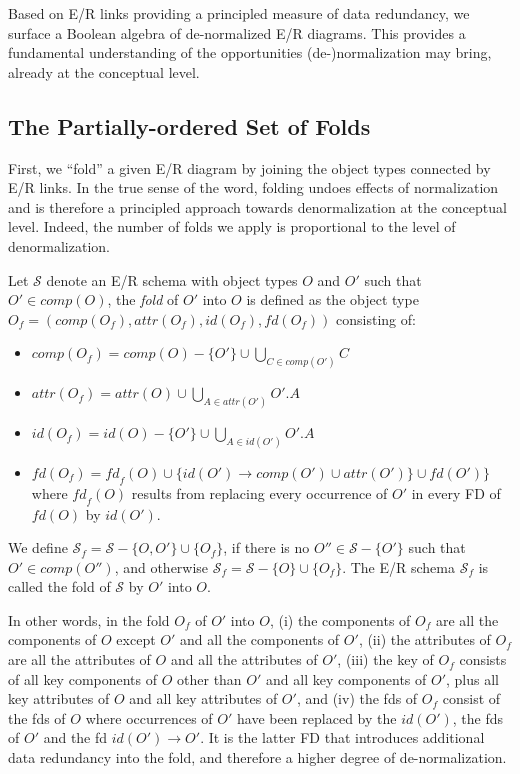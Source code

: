 \documentclass[sigconf]{acmart}
\begin{document}
Based on E/R links providing a principled measure of data redundancy, we surface a Boolean algebra of de-normalized E/R diagrams. This provides a fundamental understanding of the opportunities (de-)normalization may bring, already at the conceptual level.

\subsection{The Partially-ordered Set of Folds}

First, we ``fold'' a given E/R diagram by joining the object types connected by E/R links. In the true sense of the word, folding undoes effects of normalization and is therefore a principled approach towards denormalization at the conceptual level. Indeed, the number of folds we apply is proportional to the level of denormalization.

\begin{definition} Let $\mathcal{S}$ denote an E/R schema with object types $O$ and $O'$ such that $O'\in\textit{comp}(O)$, the \emph{fold} of $O'$ into $O$ is defined as the object type $O_f=(\textit{comp}(O_f),\textit{attr}(O_f),\textit{id}(O_f),\textit{fd}(O_f))$ consisting of:
\begin{itemize}
\item $\textit{comp}(O_f)=\textit{comp}(O)-\{O'\}\cup\bigcup_{C\in comp(O')}C$
\item $\textit{attr}(O_f)=\textit{attr}(O)\cup\bigcup_{A\in \textit{attr}(O')}O'.A$
\item $\textit{id}(O_f)=id(O)-\{O'\}\cup\bigcup_{A\in\textit{id}(O')}O'.A$
\item $\textit{fd}(O_f)=\textit{fd}_f(O)\cup\{\textit{id}(O')\rightarrow\textit{comp}(O')\cup\textit{attr}(O')\}\cup\textit{fd}(O')\}$ where $\textit{fd}_f(O)$ results from replacing every occurrence of $O'$ in every FD of $\textit{fd}(O)$ by $\textit{id}(O')$.
\end{itemize}
We define $\mathcal{S}_f=\mathcal{S}-\{O,O'\}\cup\{O_f\}$, if there is no $O''\in\mathcal{S}-\{O'\}$ such that $O'\in\textit{comp}(O'')$, and otherwise $\mathcal{S}_f=\mathcal{S}-\{O\}\cup\{O_f\}$. The E/R schema $\mathcal{S}_f$ is called the fold of $\mathcal{S}$ by $O'$ into $O$.
\end{definition}



In other words, in the fold $O_f$ of $O'$ into $O$, (i) the components of $O_f$ are all the components of $O$ except $O'$ and all the components of $O'$, (ii) the attributes of $O_f$ are all the attributes of $O$ and all the attributes of $O'$, (iii) the key of $O_f$ consists of all key components of $O$ other than $O'$ and all key components of $O'$, plus all key attributes of $O$ and all key attributes of $O'$, and (iv) the fds of $O_f$ consist of the fds of $O$ where occurrences of $O'$ have been replaced by the $\textit{id}(O')$, the fds of $O'$ and the fd $\textit{id}(O')\rightarrow O'$. It is the latter FD that introduces additional data redundancy into the fold, and therefore a higher degree of de-normalization.
\end{document}
